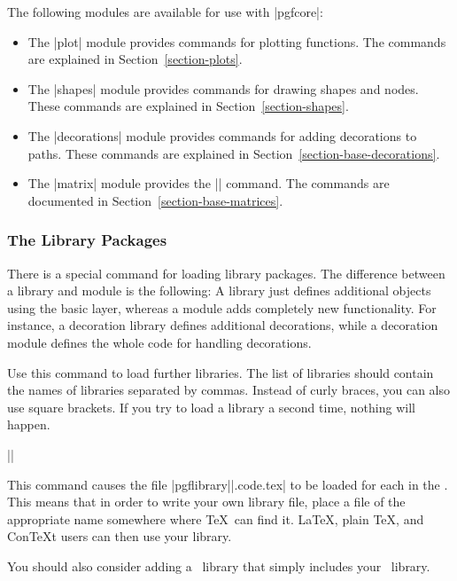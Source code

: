The following modules are available for use with |pgfcore|:
%
\begin{itemize}
    \item The |plot| module provides commands for plotting functions.  The
        commands are explained in Section~\ref{section-plots}.
    \item The |shapes| module provides commands for drawing shapes and nodes.
        These commands are explained in Section~\ref{section-shapes}.
    \item The |decorations| module provides commands for adding decorations to
        paths. These commands are explained in
        Section~\ref{section-base-decorations}.
    \item The |matrix| module provides the |\pgfmatrix| command. The commands
        are documented in Section~\ref{section-base-matrices}.
\end{itemize}


\subsubsection{The Library Packages}

There is a special command for loading library packages. The difference between
a library and module is the following: A library just defines additional
objects using the basic layer, whereas a module adds completely new
functionality. For instance, a decoration library defines additional
decorations, while a decoration module defines the whole code for handling
decorations.

\begin{command}{\usepgflibrary{}}
    Use this command to load further libraries. The list of libraries should
    contain the names of libraries separated by commas. Instead of curly
    braces, you can also use square brackets. If you try to load a library a
    second time, nothing will happen.

    \example ||

    This command causes the file |pgflibrary||.code.tex| to be
    loaded for each  in the . This means
    that in order to write your own library file, place a file of the
    appropriate name somewhere where \TeX\ can find it. \LaTeX, plain \TeX, and
    Con\TeX t users can then use your library.

    You should also consider adding a \tikzname\ library that simply includes
    your \pgfname\ library.
\end{command}


